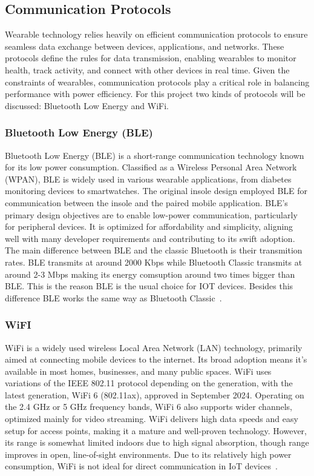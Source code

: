 \subsection{Communication Protocols} %
\label{ssec:communication_protocols}

Wearable technology relies heavily on efficient communication protocols to ensure seamless data exchange between devices, applications, and networks. These protocols define the rules 
for data transmission, enabling wearables to monitor health, track activity, and connect with other devices in real time. Given the constraints of wearables, communication protocols 
play a critical role in balancing performance with power efficiency.
For this project two kinds of protocols will be discussed: Bluetooth Low Energy and WiFi.


\subsubsection{Bluetooth Low Energy (BLE)}
\label{sssec:ble}

Bluetooth Low Energy (BLE) is a short-range communication technology known for its low power consumption. Classified as a Wireless Personal Area Network (WPAN), BLE is widely used in 
various wearable applications, from diabetes monitoring devices to smartwatches. The original insole design employed BLE for communication between the insole and the paired mobile application.
BLE's primary design objectives are to enable low-power communication, particularly for peripheral devices. It is optimized for affordability and simplicity, aligning well with many 
developer requirements and contributing to its swift adoption.
The main difference between BLE and the classic Bluetooth is their transmition rates. BLE transmits at around 2000 Kbps while Bluetooth Classic transmits at around 2-3 Mbps making its energy comsuption 
around two times bigger than BLE. This is the reason BLE is the usual choice for IOT devices. Besides this difference BLE works the same way as Bluetooth Classic~\cite{masterInsole, bachelorInsole}.

\subsubsection{WiFI}
\label{sssec:wifi}

WiFi is a widely used wireless Local Area Network (LAN) technology, primarily aimed at connecting mobile devices to the internet. Its broad adoption means it's available in most homes, businesses, and many public 
spaces. WiFi uses variations of the IEEE 802.11 protocol depending on the generation, with the latest generation, WiFi 6 (802.11ax), approved in September 2024. Operating on the 2.4 GHz or 5 GHz 
frequency bands, WiFi 6 also supports wider channels, optimized mainly for video streaming.
WiFi delivers high data speeds and easy setup for access points, making it a mature and well-proven technology. However, its range is somewhat limited indoors due to high signal 
absorption, though range improves in open, line-of-sight environments. Due to its relatively high power consumption, WiFi is not ideal for direct communication in IoT devices~\cite{masterInsole, bachelorInsole}.

